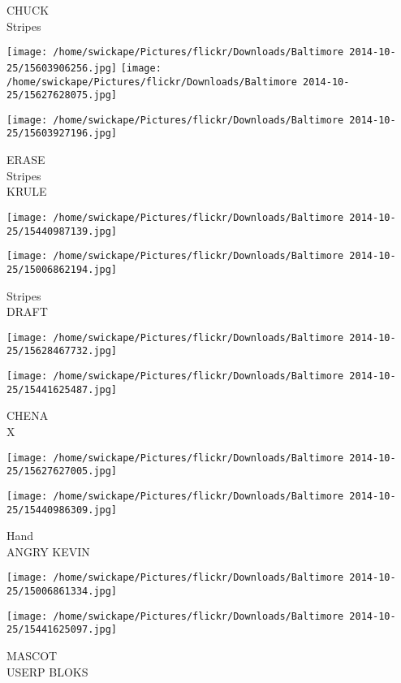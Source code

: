 \documentclass[10pt,letterpaper]{article}
\begin{document}
CHUCK\\
Stripes
\pagebreak

\texttt{[image: /home/swickape/Pictures/flickr/Downloads/Baltimore 2014-10-25/15603906256.jpg]}
\texttt{[image: /home/swickape/Pictures/flickr/Downloads/Baltimore 2014-10-25/15627628075.jpg]}

\vspace{0.25in}
\texttt{[image: /home/swickape/Pictures/flickr/Downloads/Baltimore 2014-10-25/15603927196.jpg]}

ERASE\\
Stripes\\
KRULE
\pagebreak

\texttt{[image: /home/swickape/Pictures/flickr/Downloads/Baltimore 2014-10-25/15440987139.jpg]}

\vspace{0.25in}
\texttt{[image: /home/swickape/Pictures/flickr/Downloads/Baltimore 2014-10-25/15006862194.jpg]}

Stripes\\
DRAFT
\pagebreak

\texttt{[image: /home/swickape/Pictures/flickr/Downloads/Baltimore 2014-10-25/15628467732.jpg]}

\vspace{0.25in}
\texttt{[image: /home/swickape/Pictures/flickr/Downloads/Baltimore 2014-10-25/15441625487.jpg]}

CHENA\\
X
\pagebreak

\texttt{[image: /home/swickape/Pictures/flickr/Downloads/Baltimore 2014-10-25/15627627005.jpg]}

\vspace{0.25in}
\texttt{[image: /home/swickape/Pictures/flickr/Downloads/Baltimore 2014-10-25/15440986309.jpg]}

Hand\\
ANGRY KEVIN
\pagebreak

\texttt{[image: /home/swickape/Pictures/flickr/Downloads/Baltimore 2014-10-25/15006861334.jpg]}

\vspace{0.25in}
\texttt{[image: /home/swickape/Pictures/flickr/Downloads/Baltimore 2014-10-25/15441625097.jpg]}

MASCOT\\
USERP BLOKS
\pagebreak
\end{document}
